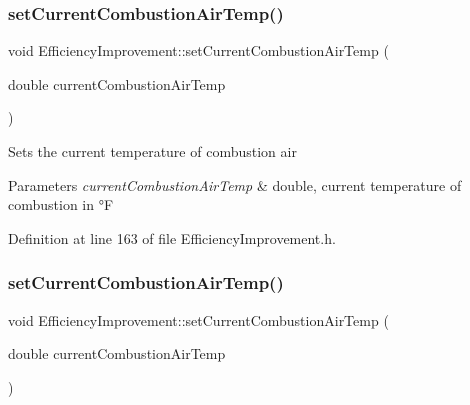 \mbox{\label{class_efficiency_improvement_a2fba09e47828dd8e6278251be8d1fa72}} 
\subsubsection{\texorpdfstring{set\+Current\+Combustion\+Air\+Temp()}{setCurrentCombustionAirTemp()}\hspace{0.1cm}{\footnotesize\ttfamily [2/3]}}
{\footnotesize\ttfamily void Efficiency\+Improvement\+::set\+Current\+Combustion\+Air\+Temp (\begin{DoxyParamCaption}\item[{double}]{current\+Combustion\+Air\+Temp }\end{DoxyParamCaption})\hspace{0.3cm}{\ttfamily [inline]}}

Sets the current temperature of combustion air


\begin{DoxyParams}{Parameters}
{\em current\+Combustion\+Air\+Temp} & double, current temperature of combustion in °F \\
\hline
\end{DoxyParams}


Definition at line 163 of file Efficiency\+Improvement.\+h.

\mbox{\label{class_efficiency_improvement_a2fba09e47828dd8e6278251be8d1fa72}} 
\subsubsection{\texorpdfstring{set\+Current\+Combustion\+Air\+Temp()}{setCurrentCombustionAirTemp()}\hspace{0.1cm}{\footnotesize\ttfamily [3/3]}}
{\footnotesize\ttfamily void Efficiency\+Improvement\+::set\+Current\+Combustion\+Air\+Temp (\begin{DoxyParamCaption}\item[{double}]{current\+Combustion\+Air\+Temp }\end{DoxyParamCaption})\hspace{0.3cm}{\ttfamily [inline]}}

